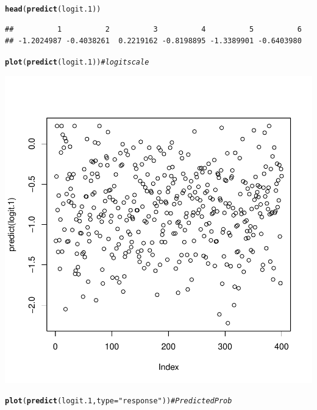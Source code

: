 \documentclass[onesided]{article}\usepackage[]{graphicx}\usepackage[]{color}
\makeatletter
\def\maxwidth{ %
  \ifdim\Gin@nat@width>\linewidth
    \linewidth
  \else
    \Gin@nat@width
  \fi
}
\newcommand{\hlstr}[1]{\textcolor[rgb]{0.192,0.494,0.8}{#1}}%
\newcommand{\hlcom}[1]{\textcolor[rgb]{0.678,0.584,0.686}{\textit{#1}}}%
\newcommand{\hlstd}[1]{\textcolor[rgb]{0.345,0.345,0.345}{#1}}%
\newcommand{\hlkwc}[1]{\textcolor[rgb]{0.333,0.667,0.333}{#1}}%
\newcommand{\hlkwd}[1]{\textcolor[rgb]{0.737,0.353,0.396}{\textbf{#1}}}%
\newenvironment{kframe}{%
 \def\at@end@of@kframe{}%
 \ifinner\ifhmode%
  \def\at@end@of@kframe{\end{minipage}}%
  \begin{minipage}{\columnwidth}%
 \fi\fi%
 \def\FrameCommand##1{\hskip\@totalleftmargin \hskip-\fboxsep
 \colorbox{shadecolor}{##1}\hskip-\fboxsep
     \hskip-\linewidth \hskip-\@totalleftmargin \hskip\columnwidth}%
 \MakeFramed {\advance\hsize-\width
   \@totalleftmargin\z@ \linewidth\hsize
   \@setminipage}}%
 {\par\unskip\endMakeFramed%
 \at@end@of@kframe}
\newenvironment{knitrout}{}{} %
\makeatother
\begin{document}
\begin{knitrout}
\color{fgcolor}\begin{kframe}
\begin{alltt}
\hlkwd{head}\hlstd{(}\hlkwd{predict}\hlstd{(logit.1))}
\end{alltt}
\begin{verbatim}
##          1          2          3          4          5          6 
## -1.2024987 -0.4038261  0.2219162 -0.8198895 -1.3389901 -0.6403980
\end{verbatim}
\begin{alltt}
\hlkwd{plot}\hlstd{(}\hlkwd{predict}\hlstd{(logit.1))} \hlcom{# logit scale}
\end{alltt}
\end{kframe}

{\centering \includegraphics[width=\maxwidth]{figure/predict:1-1} 

}


\begin{kframe}\begin{alltt}
\hlkwd{plot}\hlstd{(}\hlkwd{predict}\hlstd{(logit.1,} \hlkwc{type}\hlstd{=}\hlstr{"response"}\hlstd{))} \hlcom{# Predicted Prob}
\end{alltt}
\end{kframe}


\end{knitrout}
\end{document}
